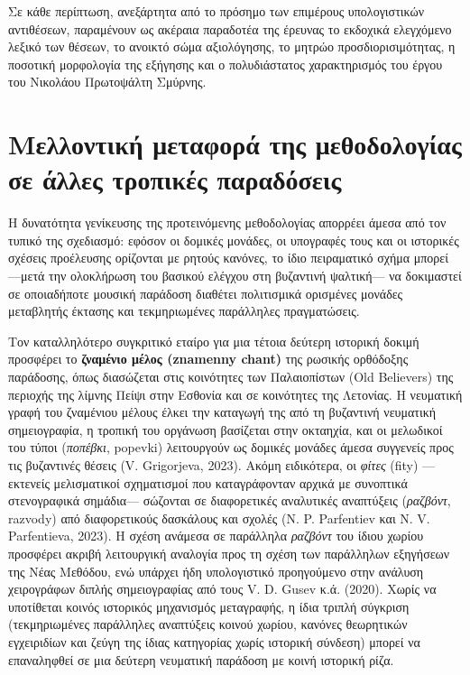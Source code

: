 \documentclass[11pt,a4paper]{article}
\begin{document}
Σε κάθε περίπτωση, ανεξάρτητα από το πρόσημο των επιμέρους υπολογιστικών αντιθέσεων, παραμένουν ως ακέραια παραδοτέα της έρευνας το εκδοχικά ελεγχόμενο λεξικό των θέσεων, το ανοικτό σώμα αξιολόγησης, το μητρώο προσδιορισιμότητας, η ποσοτική μορφολογία της εξήγησης και ο πολυδιάστατος χαρακτηρισμός του έργου του Νικολάου Πρωτοψάλτη Σμύρνης.


\section{Μελλοντική μεταφορά της μεθοδολογίας σε άλλες τροπικές παραδόσεις}\label{ux3bcux3b5ux3bbux3bbux3bfux3bdux3c4ux3b9ux3baux3ae-ux3bcux3b5ux3c4ux3b1ux3c6ux3bfux3c1ux3ac-ux3c4ux3b7ux3c2-ux3bcux3b5ux3b8ux3bfux3b4ux3bfux3bbux3bfux3b3ux3afux3b1ux3c2-ux3c3ux3b5-ux3acux3bbux3bbux3b5ux3c2-ux3c4ux3c1ux3bfux3c0ux3b9ux3baux3adux3c2-ux3c0ux3b1ux3c1ux3b1ux3b4ux3ccux3c3ux3b5ux3b9ux3c2}

Η δυνατότητα γενίκευσης της προτεινόμενης μεθοδολογίας απορρέει άμεσα από τον τυπικό της σχεδιασμό: εφόσον οι δομικές μονάδες, οι υπογραφές τους και οι ιστορικές σχέσεις προέλευσης ορίζονται με ρητούς κανόνες, το ίδιο πειραματικό σχήμα μπορεί ---μετά την ολοκλήρωση του βασικού ελέγχου στη βυζαντινή ψαλτική--- να δοκιμαστεί σε οποιαδήποτε μουσική παράδοση διαθέτει πολιτισμικά ορισμένες μονάδες μεταβλητής έκτασης και τεκμηριωμένες παράλληλες πραγματώσεις.

Τον καταλληλότερο συγκριτικό εταίρο για μια τέτοια δεύτερη ιστορική δοκιμή προσφέρει το \textbf{ζναμένιο μέλος (znamenny chant)} της ρωσικής ορθόδοξης παράδοσης, όπως διασώζεται στις κοινότητες των Παλαιοπίστων (Old Believers) της περιοχής της λίμνης Πείψι στην Εσθονία και σε κοινότητες της Λετονίας. Η νευματική γραφή του ζναμένιου μέλους έλκει την καταγωγή της από τη βυζαντινή νευματική σημειογραφία, η τροπική του οργάνωση βασίζεται στην οκταηχία, και οι μελωδικοί του τύποι (\emph{ποπέβκι}, popevki) λειτουργούν ως δομικές μονάδες άμεσα συγγενείς προς τις βυζαντινές θέσεις (V. Grigorjeva, 2023). Ακόμη ειδικότερα, οι \emph{φίτες} (fity) ---εκτενείς μελισματικοί σχηματισμοί που καταγράφονταν αρχικά με συνοπτικά στενογραφικά σημάδια--- σώζονται σε διαφορετικές αναλυτικές αναπτύξεις (\emph{ραζβόντ}, razvody) από διαφορετικούς δασκάλους και σχολές (N. P. Parfentiev και N. V. Parfentieva, 2023). Η σχέση ανάμεσα σε παράλληλα \emph{ραζβόντ} του ίδιου χωρίου προσφέρει ακριβή λειτουργική αναλογία προς τη σχέση των παράλληλων εξηγήσεων της Νέας Μεθόδου, ενώ υπάρχει ήδη υπολογιστικό προηγούμενο στην ανάλυση χειρογράφων διπλής σημειογραφίας από τους V. D. Gusev κ.ά. (2020). Χωρίς να υποτίθεται κοινός ιστορικός μηχανισμός μεταγραφής, η ίδια τριπλή σύγκριση (τεκμηριωμένες παράλληλες αναπτύξεις κοινού χωρίου, κανόνες θεωρητικών εγχειριδίων και ζεύγη της ίδιας κατηγορίας χωρίς ιστορική σύνδεση) μπορεί να επαναληφθεί σε μια δεύτερη νευματική παράδοση με κοινή ιστορική ρίζα.
\end{document}
